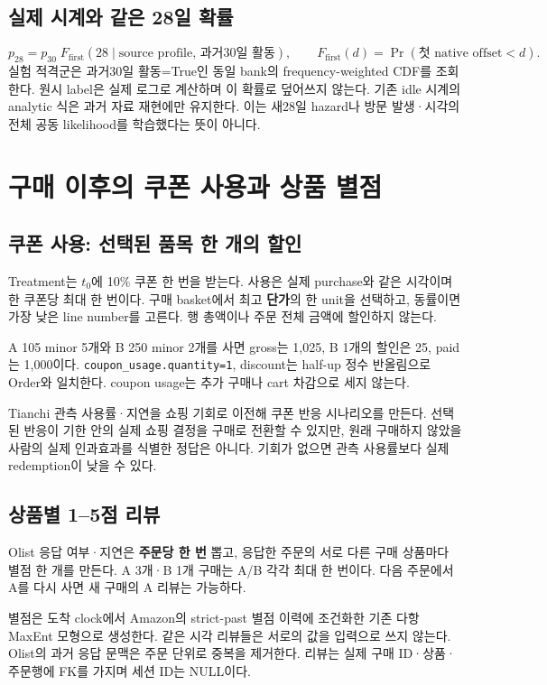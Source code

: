 \documentclass[11pt,a4paper]{article}
\newcommand{\code}[1]{{\ttfamily\footnotesize\nolinkurl{#1}}}
\newcommand{\page}{\clearpage}
\begin{document}
\subsection{실제 시계와 같은 28일 확률}
\[
p_{28}=p_{30}\;F_{\mathrm{first}}(28\mid\text{source profile, 과거30일 활동}),\qquad
F_{\mathrm{first}}(d)=\Pr(\text{첫 native offset}<d).
\]
실험 적격군은 과거30일 활동=True인 동일 bank의 frequency-weighted CDF를 조회한다. 원시 label은 실제 로그로 계산하며 이 확률로 덮어쓰지 않는다. 기존 idle 시계의 analytic 식은 과거 자료 재현에만 유지한다. 이는 새28일 hazard나 방문 발생·시각의 전체 공동 likelihood를 학습했다는 뜻이 아니다.

\page
\section{구매 이후의 쿠폰 사용과 상품 별점}
\subsection{쿠폰 사용: 선택된 품목 한 개의 할인}
Treatment는 $t_0$에 10\% 쿠폰 한 번을 받는다. 사용은 실제 purchase와 같은 시각이며 한 쿠폰당 최대 한 번이다. 구매 basket에서 최고 \textbf{단가}의 한 unit을 선택하고, 동률이면 가장 낮은 line number를 고른다. 행 총액이나 주문 전체 금액에 할인하지 않는다.

A 105 minor 5개와 B 250 minor 2개를 사면 gross는 1,025, B 1개의 할인은 25, paid는 1,000이다. \code{coupon_usage.quantity=1}, discount는 half-up 정수 반올림으로 Order와 일치한다. coupon usage는 추가 구매나 cart 차감으로 세지 않는다.

Tianchi 관측 사용률·지연을 쇼핑 기회로 이전해 쿠폰 반응 시나리오를 만든다. 선택된 반응이 기한 안의 실제 쇼핑 결정을 구매로 전환할 수 있지만, 원래 구매하지 않았을 사람의 실제 인과효과를 식별한 정답은 아니다. 기회가 없으면 관측 사용률보다 실제 redemption이 낮을 수 있다.

\subsection{상품별 1--5점 리뷰}
Olist 응답 여부·지연은 \textbf{주문당 한 번} 뽑고, 응답한 주문의 서로 다른 구매 상품마다 별점 한 개를 만든다. A 3개·B 1개 구매는 A/B 각각 최대 한 번이다. 다음 주문에서 A를 다시 사면 새 구매의 A 리뷰는 가능하다.

별점은 도착 clock에서 Amazon의 strict-past 별점 이력에 조건화한 기존 다항 MaxEnt 모형으로 생성한다. 같은 시각 리뷰들은 서로의 값을 입력으로 쓰지 않는다. Olist의 과거 응답 문맥은 주문 단위로 중복을 제거한다. 리뷰는 실제 구매 ID·상품·주문행에 FK를 가지며 세션 ID는 NULL이다.
\end{document}
